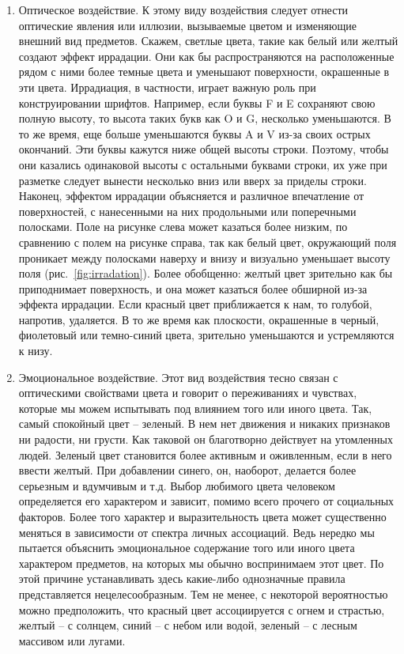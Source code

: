\begin{enumerate}
\item Оптическое воздействие. К этому виду воздействия следует отнести
  оптические явления или иллюзии, вызываемые цветом и изменяющие внешний вид
  предметов. Скажем, светлые цвета, такие как белый или желтый создают эффект
  иррадации. Они как бы распространяются на расположенные рядом с ними более
  темные цвета и уменьшают поверхности, окрашенные в эти цвета. Иррадиация, в частности, играет важную
  роль при конструировании шрифтов. Например, если буквы F и E сохраняют свою полную высоту, то высота
  таких букв как O и G, несколько уменьшаются. В то же время, еще больше уменьшаются буквы A и V из-за
  своих острых окончаний. Эти буквы кажутся ниже общей высоты строки.  Поэтому, чтобы они казались
  одинаковой высоты с остальными буквами строки, их уже при разметке следует вынести несколько вниз
  или вверх за приделы строки.  Наконец, эффектом иррадации объясняется и различное впечатление от
  поверхностей, с нанесенными на них продольными или поперечными полосками.
  Поле на рисунке слева может казаться более низким, по сравнению с полем на рисунке справа, так как белый
  цвет, окружающий поля проникает между полосками наверху и внизу и визуально уменьшает высоту
  поля (рис.~\ref{fig:irradation}). Более обобщенно: желтый цвет зрительно как бы приподнимает
  поверхность, и она может казаться более обширной из-за эффекта иррадации. Если красный цвет
  приближается к нам, то голубой, напротив, удаляется. В то же время как плоскости, окрашенные в
  черный, фиолетовый или темно-синий цвета, зрительно уменьшаются и устремляются к низу.
\item Эмоциональное воздействие. Этот вид воздействия тесно связан с
  оптическими свойствами цвета и говорит о переживаниях и чувствах, которые
  мы можем испытывать под влиянием того или иного цвета. Так, самый спокойный
  цвет -- зеленый. В нем нет движения и никаких признаков ни радости, ни грусти.
  Как таковой он благотворно действует на утомленных людей. Зеленый цвет
  становится более активным и оживленным, если в него ввести желтый. При
  добавлении синего, он, наоборот, делается более серьезным и вдумчивым и т.д.
  Выбор любимого цвета человеком определяется его характером и зависит, помимо
  всего прочего от социальных факторов. Более того характер и выразительность
  цвета может существенно меняться в зависимости от спектра личных ассоциаций.
  Ведь нередко мы пытается объяснить эмоциональное содержание того или иного
  цвета характером предметов, на которых мы обычно воспринимаем этот цвет.
  По этой причине устанавливать здесь какие-либо однозначные правила
  представляется нецелесообразным. Тем не менее, с некоторой вероятностью
  можно предположить, что красный цвет ассоциируется с огнем и страстью,
  желтый -- с солнцем, синий -- с небом или водой, зеленый -- с лесным массивом
  или лугами.
\end{enumerate}


